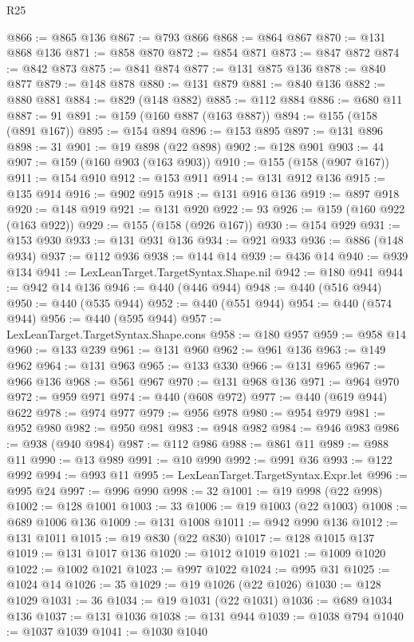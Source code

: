 \begin{lexlean}{R25}
\begin{coremodule}
@866 := @865 @136
@867 := @793 @866
@868 := @864 @867
@870 := @131 @868 @136
@871 := @858 @870
@872 := @854 @871
@873 := @847 @872
@874 := @842 @873
@875 := @841 @874
@877 := @131 @875 @136
@878 := @840 @877
@879 := @148 @878
@880 := @131 @879
@881 := @840 @136
@882 := @880 @881
@884 := @829 (@148 @882)
@885 := @112 @884
@886 := @680 @11
@887 := 91
@891 := @159 (@160 @887 (@163 @887))
@894 := @155 (@158 (@891 @167))
@895 := @154 @894
@896 := @153 @895
@897 := @131 @896
@898 := 31
@901 := @19 @898 (@22 @898)
@902 := @128 @901
@903 := 44
@907 := @159 (@160 @903 (@163 @903))
@910 := @155 (@158 (@907 @167))
@911 := @154 @910
@912 := @153 @911
@914 := @131 @912 @136
@915 := @135 @914
@916 := @902 @915
@918 := @131 @916 @136
@919 := @897 @918
@920 := @148 @919
@921 := @131 @920
@922 := 93
@926 := @159 (@160 @922 (@163 @922))
@929 := @155 (@158 (@926 @167))
@930 := @154 @929
@931 := @153 @930
@933 := @131 @931 @136
@934 := @921 @933
@936 := @886 (@148 @934)
@937 := @112 @936
@938 := @144 @14
@939 := @436 @14
@940 := @939 @134
@941 := LexLeanTarget.TargetSyntax.Shape.nil
@942 := @180 @941
@944 := @942 @14 @136
@946 := @440 (@446 @944)
@948 := @440 (@516 @944)
@950 := @440 (@535 @944)
@952 := @440 (@551 @944)
@954 := @440 (@574 @944)
@956 := @440 (@595 @944)
@957 := LexLeanTarget.TargetSyntax.Shape.cons
@958 := @180 @957
@959 := @958 @14
@960 := @133 @239
@961 := @131 @960
@962 := @961 @136
@963 := @149 @962
@964 := @131 @963
@965 := @133 @330
@966 := @131 @965
@967 := @966 @136
@968 := @561 @967
@970 := @131 @968 @136
@971 := @964 @970
@972 := @959 @971
@974 := @440 (@608 @972)
@977 := @440 (@619 @944) @622
@978 := @974 @977
@979 := @956 @978
@980 := @954 @979
@981 := @952 @980
@982 := @950 @981
@983 := @948 @982
@984 := @946 @983
@986 := @938 (@940 @984)
@987 := @112 @986
@988 := @861 @11
@989 := @988 @11
@990 := @13 @989
@991 := @10 @990
@992 := @991 @36
@993 := @122 @992
@994 := @993 @11
@995 := LexLeanTarget.TargetSyntax.Expr.let
@996 := @995 @24
@997 := @996 @990
@998 := 32
@1001 := @19 @998 (@22 @998)
@1002 := @128 @1001
@1003 := 33
@1006 := @19 @1003 (@22 @1003)
@1008 := @689 @1006 @136
@1009 := @131 @1008
@1011 := @942 @990 @136
@1012 := @131 @1011
@1015 := @19 @830 (@22 @830)
@1017 := @128 @1015 @137
@1019 := @131 @1017 @136
@1020 := @1012 @1019
@1021 := @1009 @1020
@1022 := @1002 @1021
@1023 := @997 @1022
@1024 := @995 @31
@1025 := @1024 @14
@1026 := 35
@1029 := @19 @1026 (@22 @1026)
@1030 := @128 @1029
@1031 := 36
@1034 := @19 @1031 (@22 @1031)
@1036 := @689 @1034 @136
@1037 := @131 @1036
@1038 := @131 @944
@1039 := @1038 @794
@1040 := @1037 @1039
@1041 := @1030 @1040

\end{coremodule}
\end{lexlean}
